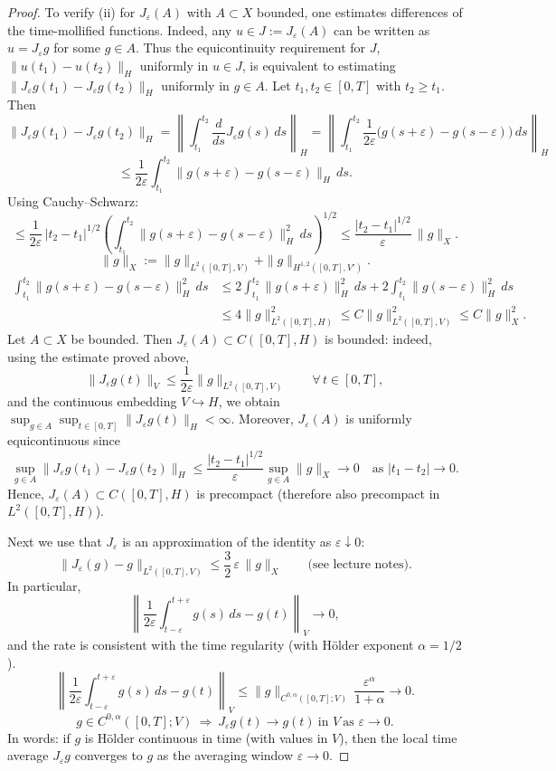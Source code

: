 \documentclass[11pt]{article}
\theoremstyle{definition}
\theoremstyle{remark}
\begin{document}
\begin{proof}
To verify (ii) for \(J_\varepsilon(A)\) with \(A\subset X\) bounded, one estimates differences of the time-mollified functions.
Indeed, any \(u\in J:=J_\varepsilon(A)\) can be written as \(u=J_\varepsilon g\) for some \(g\in A\). Thus the equicontinuity requirement for \(J\),
\(\|u(t_{1})-u(t_{2})\|_{H}\) uniformly in \(u\in J\), is equivalent to estimating \(\|J_\varepsilon g(t_{1})-J_\varepsilon g(t_{2})\|_{H}\) uniformly in \(g\in A\).
Let \(t_{1},t_{2}\in[0,T]\) with \(t_{2}\ge t_{1}\). Then
\[
\|J_\varepsilon g(t_{1})-J_\varepsilon g(t_{2})\|_{H}
=\left\|\int_{t_{1}}^{t_{2}}\frac{d}{ds}J_\varepsilon g(s)\,ds\right\|_{H}
=\left\|\int_{t_{1}}^{t_{2}}\frac{1}{2\varepsilon}\bigl(g(s+\varepsilon)-g(s-\varepsilon)\bigr)\,ds\right\|_{H}
\]
\[
\le \frac{1}{2\varepsilon}\int_{t_{1}}^{t_{2}}\|g(s+\varepsilon)-g(s-\varepsilon)\|_{H}\,ds.
\]
Using Cauchy--Schwarz:
\[
\le \frac{1}{2\varepsilon}\,|t_{2}-t_{1}|^{1/2}
\left(\int_{t_{1}}^{t_{2}}\|g(s+\varepsilon)-g(s-\varepsilon)\|_{H}^{2}\,ds\right)^{1/2}
\le \frac{|t_{2}-t_{1}|^{1/2}}{\varepsilon}\,\|g\|_{X}.
\]
\[
\|g\|_{X}:=\|g\|_{L^{2}([0,T],V)}+\|g\|_{H^{1,2}([0,T],V')}.
\]
\begin{align*}
\int_{t_{1}}^{t_{2}}\|g(s+\varepsilon)-g(s-\varepsilon)\|_{H}^{2}\,ds
&\le 2\int_{t_{1}}^{t_{2}}\|g(s+\varepsilon)\|_{H}^{2}\,ds
+2\int_{t_{1}}^{t_{2}}\|g(s-\varepsilon)\|_{H}^{2}\,ds\\
&\le 4\|g\|_{L^{2}([0,T],H)}^{2}
\le C\|g\|_{L^{2}([0,T],V)}^{2}
\le C\|g\|_{X}^{2}.
\end{align*}
Let \(A\subset X\) be bounded.
Then \(J_\varepsilon(A)\subset C([0,T],H)\) is bounded: indeed, using the estimate proved above,
\[
\|J_\varepsilon g(t)\|_{V}\le \frac{1}{2\varepsilon}\|g\|_{L^{2}([0,T],V)}\qquad \forall\,t\in[0,T],
\]
and the continuous embedding \(V\hookrightarrow H\), we obtain \(\sup_{g\in A}\sup_{t\in[0,T]}\|J_\varepsilon g(t)\|_{H}<\infty\).
Moreover, \(J_\varepsilon(A)\) is uniformly equicontinuous since
\[
\sup_{g\in A}\|J_\varepsilon g(t_{1})-J_\varepsilon g(t_{2})\|_{H}
\le \frac{|t_{2}-t_{1}|^{1/2}}{\varepsilon}\sup_{g\in A}\|g\|_{X}\to 0
\quad \text{as }|t_{1}-t_{2}|\to 0.
\]
Hence, \(J_\varepsilon(A)\subset C([0,T],H)\) is precompact (therefore also precompact in \(L^{2}([0,T],H)\)).

Next we use that \(J_\varepsilon\) is an approximation of the identity as \(\varepsilon\downarrow 0\):
\[
\|J_\varepsilon(g)-g\|_{L^{2}([0,T],V)}\le \frac{3}{2}\,\varepsilon\,\|g\|_{X}
\qquad \text{(see lecture notes).}
\]
In particular,
\[
\left\|\frac{1}{2\varepsilon}\int_{t-\varepsilon}^{t+\varepsilon}g(s)\,ds-g(t)\right\|_{V}\to 0,
\]
and the rate is consistent with the time regularity (with H\"older exponent \(\alpha=1/2\)).
\[
\left\|\frac{1}{2\varepsilon}\int_{t-\varepsilon}^{t+\varepsilon}g(s)\,ds-g(t)\right\|_{V}
\le \|g\|_{C^{0,\alpha}([0,T];V)}\,\frac{\varepsilon^{\alpha}}{1+\alpha}\to 0.
\]
\[
g\in C^{0,\alpha}([0,T];V)\ \Longrightarrow\ J_\varepsilon g(t)\to g(t)\ \text{in }V\ \text{as }\varepsilon\to 0.
\]
In words: if \(g\) is H\"older continuous in time (with values in \(V\)), then the local time average \(J_\varepsilon g\) converges to \(g\) as the averaging window \(\varepsilon\to 0\).


\end{proof}
\end{document}
